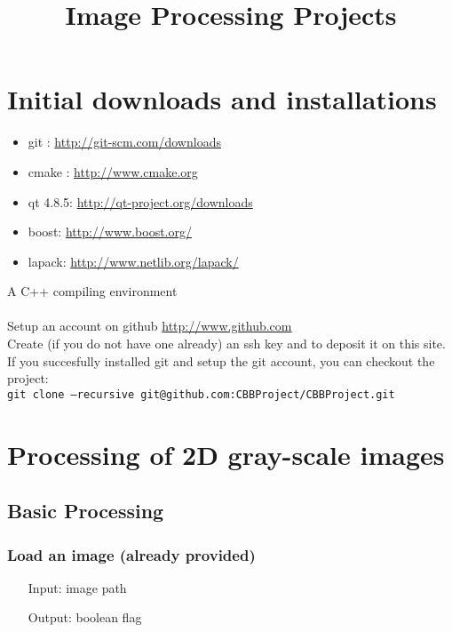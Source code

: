\documentclass[10pt,a4paper]{article}
\title{Image Processing Projects}
\author{}
\date{}
\begin{document}
\maketitle

\section{Initial downloads and installations}
\begin{itemize}
\item git : \url{http://git-scm.com/downloads}
\item cmake : \url{http://www.cmake.org}
\item qt 4.8.5: \url{http://qt-project.org/downloads} 
\item boost: \url{http://www.boost.org/}
\item lapack: \url{http://www.netlib.org/lapack/}
\end{itemize}
A C++ compiling environment\\
\\
Setup an account on github \url{http://www.github.com} \\
Create (if you do not have one already) an ssh key and to deposit it on this site.\\
If you succesfully installed git and setup the git account, you can
checkout the project:\\

{\tt git clone --recursive git@github.com:CBBProject/CBBProject.git}

\section{Processing of 2D gray-scale images}

\subsection{Basic Processing}


\subsubsection{Load an image (already provided)} 
\begin{itemize}   
\item[Input:] image path
\item[Output:] boolean flag 
\end{itemize}
\end{document}
